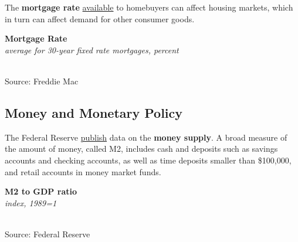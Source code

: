 \documentclass{report}
\makeatletter
\newcommand{\tbllink}[1]{\href{https://raw.githubusercontent.com/bdecon/US-chartbook/master/chartbook/data/#1}{\faTable}}
\newcommand*\short[1]{\expandafter\@gobbletwo\number\numexpr#1\relax}
\newcommand{\dateaxisticks}{
		date coordinates in=x, axis line style={draw=none},
		xmax={2022-10-31},
		max space between ticks=40,	    
		xtick={{1990-01-01}, {1992-01-01}, {1994-01-01}, 
			{1996-01-01}, {1998-01-01}, {2000-01-01}, 
			{2002-01-01}, {2004-01-01}, {2006-01-01},
			{2008-01-01}, {2010-01-01}, {2012-01-01}, {2014-01-01},
		    {2016-01-01}, {2018-01-01}, {2020-01-01}, {2022-01-01}, 
		    {2024-01-01}, {2026-01-01}},
		minor xtick={{1989-01-01}, {1991-01-01}, {1993-01-01},
			{1995-01-01}, {1997-01-01}, {1999-01-01}, 
			{2001-01-01}, {2003-01-01}, {2005-01-01}, {2007-01-01},
		    {2009-01-01}, {2011-01-01}, {2013-01-01}, {2015-01-01},
		    {2017-01-01}, {2019-01-01}, {2021-01-01}, {2023-01-01}, 
		    {2025-01-01}, {2027-01-01}},
		enlarge y limits={0.06}, enlarge x limits={0.01},
		}
\newcommand{\shdateaxisticks}{
		date coordinates in=x, axis line style={draw=none},
		xmax={2022-10-31},
		max space between ticks=40,	    
		xtick={{1990-01-01}, {1995-01-01}, {2000-01-01}, 
			{2005-01-01}, {2010-01-01}, {2015-01-01}, {2020-01-01}},
		minor xtick={},
		enlarge y limits={0.06}, enlarge x limits={0.01},
		}
\newcommand{\bbar}[2]{extra #1 ticks = {{#2}}, extra #1 tick labels = ,
		extra #1 tick style = {grid=major, grid style={thick, black!25}},}
\newcommand{\stdline}[4]{\addplot[very thick, no markers, color=#1] 
		table [x=#2, y=#3, col sep=comma] {#4};	}
\newcommand{\thickline}[4]{\addplot[ultra thick, no markers, color=#1] 
		table [x=#2, y=#3, col sep=comma] {#4};	}
\newcommand{\rbars}{
		\fill[color=black!10] (axis cs:{1990-07-01},\pgfkeysvalueof{/pgfplots/ymin}) rectangle 
			(axis cs:{1991-03-01}, \pgfkeysvalueof{/pgfplots/ymax});
		\fill[color=black!10] (axis cs:{2007-12-01},\pgfkeysvalueof{/pgfplots/ymin}) rectangle 
			(axis cs:{2009-07-01}, \pgfkeysvalueof{/pgfplots/ymax});
		\fill[color=black!10] (axis cs:{2001-03-01},\pgfkeysvalueof{/pgfplots/ymin}) rectangle 
			(axis cs:{2001-11-01}, \pgfkeysvalueof{/pgfplots/ymax});
		\fill[color=black!10] (axis cs:{2020-02-01},\pgfkeysvalueof{/pgfplots/ymin}) rectangle 
			(axis cs:{2020-05-01}, \pgfkeysvalueof{/pgfplots/ymax});}
\makeatother
\begin{document}
{\begin{minipage}{0.76\textwidth}
\small The \textbf{mortgage rate} \href{https://www.freddiemac.com/pmms/pmms30}{available} to homebuyers can affect housing markets, which in turn can affect demand for other consumer goods.  
\vspace{0.5mm} 

\normalsize \textbf{Mortgage Rate}\\
\footnotesize{\textit{average for 30-year fixed rate mortgages, percent}}\\
\hspace*{-2mm} \\
\footnotesize{Source: Freddie Mac} \hfill \tbllink{mortgage.csv}
\end{minipage}
\newpage
\hypertarget{capmm}{}
\begin{minipage}{0.76\textwidth}
\subsection*{Money and Monetary Policy}
\small The Federal Reserve \href{https://www.federalreserve.gov/releases/h6/current/default.htm}{publish} data on the \textbf{money supply}. A broad measure of the amount of money, called M2, includes cash and deposits such as savings accounts and checking accounts, as well as time deposits smaller than \$100,000, and retail accounts in money market funds. 

\begin{minipage}{0.48\textwidth}

\end{minipage} \hfill \begin{minipage}{0.45\textwidth}
\normalsize \textbf{M2 to GDP ratio}\\
\footnotesize{\textit{index, 1989=1}}\\
\hspace*{-2mm} \\
\footnotesize{Source: Federal Reserve} \hfill \tbllink{m2gdp.csv}
\end{minipage}
\vspace{2mm}


\end{minipage}}
\end{document}
